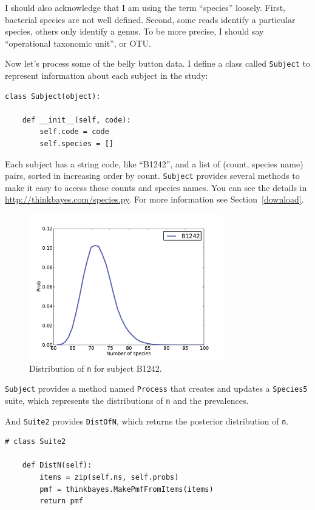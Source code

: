 \documentclass[12pt]{book}
\begin{document}
I should also acknowledge that I am using the term ``species''
loosely.  First, bacterial species are not well defined.  Second,
some reads identify a particular species, others only identify
a genus.  To be more precise, I should say ``operational
taxonomic unit'', or OTU.

Now let's process some of the belly button data.  I define
a class called {\tt Subject} to represent information about
each subject in the study:

\begin{verbatim}
class Subject(object):

    def __init__(self, code):
        self.code = code
        self.species = []
\end{verbatim}

Each subject has a string code, like ``B1242'', and a list of
(count, species name) pairs, sorted in increasing order by count.
{\tt Subject} provides several methods to make it
easy to access these counts and species names.  You can see the details
in \url{http://thinkbayes.com/species.py}.
  For more information
see Section~\ref{download}.

\begin{figure}
\centerline{\includegraphics[height=2.5in]{figs/species-ndist-B1242.pdf}}
\caption{Distribution of {\tt n} for subject B1242.}
\label{species-ndist}
\end{figure}

{\tt Subject} provides a method named {\tt Process} that creates and
updates a {\tt Species5} suite,
which represents the distributions of {\tt n} and the prevalences.

And {\tt Suite2} provides {\tt DistOfN}, which returns the posterior
distribution of {\tt n}.

\begin{verbatim}
# class Suite2

    def DistN(self):
        items = zip(self.ns, self.probs)
        pmf = thinkbayes.MakePmfFromItems(items)
        return pmf
\end{verbatim}
\end{document}
